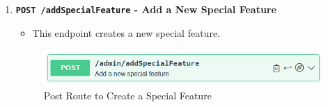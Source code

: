 \begin{enumerate}
        \item \textbf{\texttt{POST /addSpecialFeature} - Add a New Special Feature}
        \begin{itemize}
            \item This endpoint creates a new special feature.
        \end{itemize} 
        \begin{figure} [H]
            \centering
            \includegraphics [width=1\textwidth] {images/andreas/praxis/addSF.png}
            \caption{Post Route to Create a Special Feature}
        \end{figure}
    \end{enumerate}

